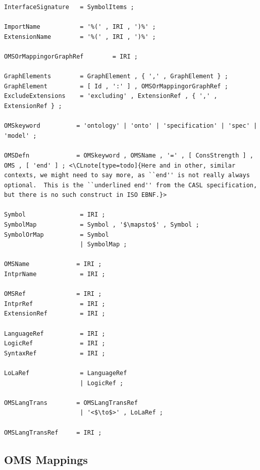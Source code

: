 \documentclass[10pt,%
\ifpretendfinal
final%
\else
draft%
\fi,
]{scrreprt}
\makeatletter
\newcommand*\CommentAuthor{}
\renewcommand*\CommentAuthor{#1}}
\newcommand*\CommentDate{}
\renewcommand*\CommentDate{#1}}
\newcommand*\CommentId{}
\renewcommand*\CommentId{#1}}
\newcommand*\CommentType{}
\renewcommand*\CommentType{#1}}
\newcommand*{\SetCommentColorByType}[1]{%
\edef\localType{{#1}}%
\expandafter\ifstrequal\localType{q-aut}{\colorlet{CommentColor}{red}}{%
\expandafter\ifstrequal\localType{q-all}{\colorlet{CommentColor}{orange}}{%
\expandafter\ifstrequal\localType{todo}{\colorlet{CommentColor}{orange}}{%
\expandafter\ifstrequal\localType{fyi}{\colorlet{CommentColor}{lightgray}}{%
\colorlet{CommentColor}{yellow}}}}}}
\newcommand*{\SetCommentPrefixByType}[1]{%
\edef\localType{{#1}}%
\expandafter\@ifmtarg\localType{%
\edef\CommentPrefix{}%
}{%
\caseupper[q]{#1}%
\edef\CommentPrefix{\thestring: }%
}}
\newcommand*{\initComment}[1]{%
\setkeys{Comment}{#1}%
\SetCommentColorByType{\CommentType}%
\relax%
\SetCommentPrefixByType{\CommentType}%
\relax%
}
\newcommand*{\todonote}[2][]{%
\initComment{#1}%
\pdfcomment[author=\CommentAuthor,color=CommentColor,date=\CommentDate,id=\CommentId]{%
\CommentPrefix
#2}}
\renewcommand*{\todonote}[2][]{%
\initComment{#1}%
\ednote{\CommentPrefix #2}}
\newcommand*{\CLnote}[2][author=Christoph Lange]{%
\todonote[author=Christoph Lange,#1]{#2} 
}
\newcommand{\ssclause}[1]{\subsection{#1}}
\makeatother
\begin{document}
\begin{lstlisting}[language=ebnf,escapeinside={<>},mathescape]
InterfaceSignature   = SymbolItems ;

ImportName           = '%(' , IRI , ')%' ;
ExtensionName        = '%(' , IRI , ')%' ;

OMSOrMappingorGraphRef        = IRI ;

GraphElements        = GraphElement , { ',' , GraphElement } ;
GraphElement         = [ Id , ':' ] , OMSOrMappingorGraphRef ;
ExcludeExtensions    = 'excluding' , ExtensionRef , { ',' , ExtensionRef } ;

OMSkeyword          = 'ontology' | 'onto' | 'specification' | 'spec' | 'model' ;

OMSDefn             = OMSkeyword , OMSName , '=' , [ ConsStrength ] , OMS , [ 'end' ] ; <\CLnote[type=todo]{Here and in other, similar contexts, we might need to say more, as ``end'' is not really always optional.  This is the ``underlined end'' from the CASL specification, but there is no such construct in ISO EBNF.}> 

Symbol               = IRI ;
SymbolMap            = Symbol , '$\mapsto$' , Symbol ;
SymbolOrMap          = Symbol
                     | SymbolMap ;

OMSName             = IRI ;
IntprName            = IRI ;

OMSRef              = IRI ;
IntprRef             = IRI ;
ExtensionRef         = IRI ;

LanguageRef          = IRI ;
LogicRef             = IRI ;
SyntaxRef            = IRI ;

LoLaRef              = LanguageRef
                     | LogicRef ;

OMSLangTrans        = OMSLangTransRef
                     | '<$\to$>' , LoLaRef ;

OMSLangTransRef     = IRI ;
\end{lstlisting}


\ssclause{OMS Mappings}
\end{document}
